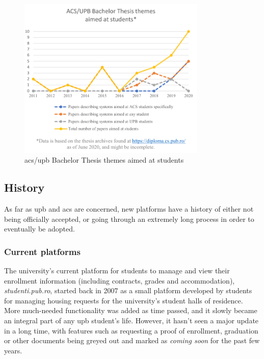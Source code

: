     \begin{figure}[ht]
        \centering
             \includegraphics[width=0.8\textwidth]{figures/charts/papers_aimed_at_students.pdf}
        \caption{\acrshort{acs}/\acrshort{upb} Bachelor Thesis themes aimed at students}
        \label{2:fig:papers_aimed_at_students}
    \end{figure}
    
    \subsection{History} \label{2:existing_apps_history}
    As far as \acrshort{upb} and \acrshort{acs} are concerned, new platforms have a history of either not being officially accepted, or going through an extremely long process in order to eventually be adopted.
    
    \subsubsection{Current platforms} \label{2:existing_apps_history_current}
    The university's current platform for students to manage and view their enrollment information (including contracts, grades and accommodation),  \textit{studenti.pub.ro}, started back in 2007 as a small platform developed by students for managing housing requests for the university's student halls of residence. More much-needed functionality was added as time passed, and it slowly became an integral part of any \acrshort{upb} student's life. However, it hasn't seen a major update in a long time, with features such as requesting a proof of enrollment, graduation or other documents being greyed out and marked as \textit{coming soon} for the past few years.
    
